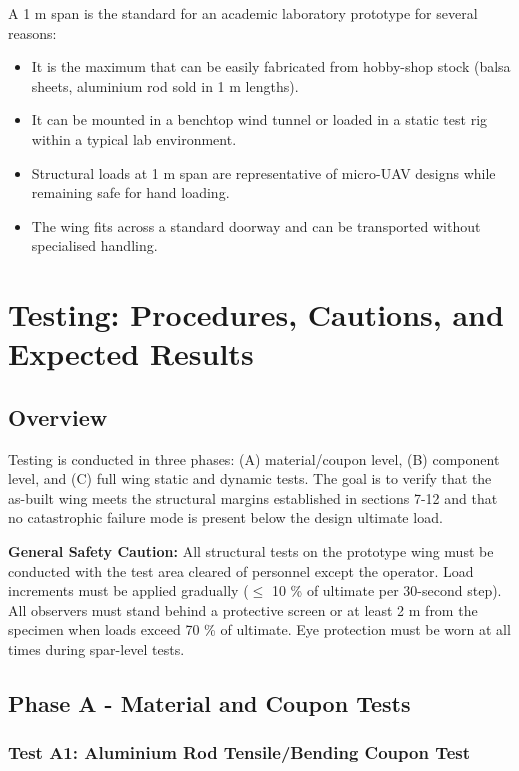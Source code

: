 \documentclass[10pt,a4paper]{article}
\begin{document}
A 1 m span is the standard for an academic laboratory prototype for several reasons:
\begin{itemize}[noitemsep,topsep=2pt]
\item It is the maximum that can be easily fabricated from hobby-shop stock (balsa sheets, aluminium rod sold in 1 m lengths).
\item It can be mounted in a benchtop wind tunnel or loaded in a static test rig within a typical lab environment.
\item Structural loads at 1 m span are representative of micro-UAV designs while remaining safe for hand loading.
\item The wing fits across a standard doorway and can be transported without specialised handling.
\end{itemize}

\newpage \section{Testing: Procedures, Cautions, and Expected Results}

\subsection{Overview}

Testing is conducted in three phases: (A) material/coupon level, (B) component level, and (C) full wing static and dynamic tests. The goal is to verify that the as-built wing meets the structural margins established in sections 7-12 and that no catastrophic failure mode is present below the design ultimate load.

\textbf{General Safety Caution:} All structural tests on the prototype wing must be conducted with the test area cleared of personnel except the operator. Load increments must be applied gradually (${\leq}$ 10 \% of ultimate per 30-second step). All observers must stand behind a protective screen or at least 2 m from the specimen when loads exceed 70 \% of ultimate. Eye protection must be worn at all times during spar-level tests.

\subsection{Phase A - Material and Coupon Tests}

\subsubsection{Test A1: Aluminium Rod Tensile/Bending Coupon Test}
\end{document}

